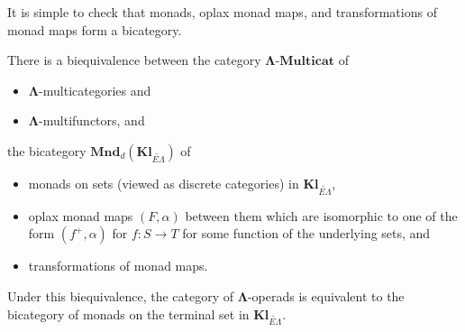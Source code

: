 \documentclass{amsbook} %
\newcommand{\mb}{\mathbf}
\numberwithin{section}{chapter}
\begin{document}
It is simple to check that monads, oplax monad maps, and transformations of monad maps form a bicategory.


\begin{thm}
There is a biequivalence between the category $\mb{\Lambda}\mbox{-}\mb{Multicat}$ of
\begin{itemize}
\item $\mb{\Lambda}$-multicategories and
\item $\mb{\Lambda}$-multifunctors, and
\end{itemize}
 the bicategory $\mb{Mnd}_{d}(\mb{Kl}_{\widetilde{E\Lambda}})$ of
\begin{itemize}
\item monads on sets (viewed as discrete categories) in $\mb{Kl}_{\widetilde{E\Lambda}}$,
\item oplax monad maps $(F, \alpha)$ between them which are isomorphic to one of the form $(f^{+}, \alpha)$ for $f:S \to T$ for some function of the underlying sets, and
\item transformations of monad maps.
\end{itemize}
Under this biequivalence, the category of $\mb{\Lambda}$-operads is equivalent to the bicategory of monads on the terminal set in $\mb{Kl}_{\widetilde{E\Lambda}}$.
\end{thm}
\end{document}
